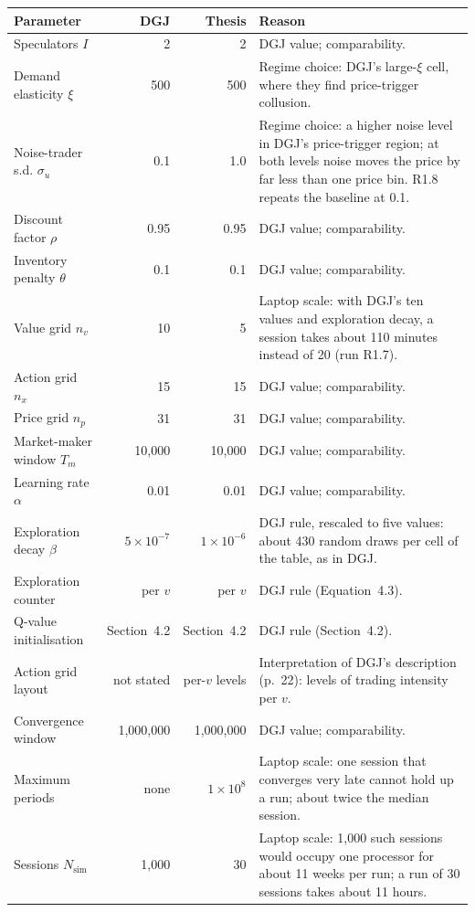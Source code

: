 \begin{tabular}{lrr>{\raggedright\arraybackslash}p{5.6cm}}
\toprule
Parameter & DGJ & Thesis & Reason \\
\midrule
Speculators $I$ & 2 & 2 & DGJ value; comparability. \\
Demand elasticity $\xi$ & 500 & 500 & Regime choice: DGJ's large-$\xi$ cell, where they find price-trigger collusion. \\
Noise-trader s.d. $\sigma_u$ & 0.1 & 1.0 & Regime choice: a higher noise level in DGJ's price-trigger region; at both levels noise moves the price by far less than one price bin. R1.8 repeats the baseline at 0.1. \\
Discount factor $\rho$ & 0.95 & 0.95 & DGJ value; comparability. \\
Inventory penalty $\theta$ & 0.1 & 0.1 & DGJ value; comparability. \\
Value grid $n_v$ & 10 & 5 & Laptop scale: with DGJ's ten values and exploration decay, a session takes about 110 minutes instead of 20 (run R1.7). \\
Action grid $n_x$ & 15 & 15 & DGJ value; comparability. \\
Price grid $n_p$ & 31 & 31 & DGJ value; comparability. \\
Market-maker window $T_m$ & 10,000 & 10,000 & DGJ value; comparability. \\
Learning rate $\alpha$ & 0.01 & 0.01 & DGJ value; comparability. \\
Exploration decay $\beta$ & $5\times10^{-7}$ & $1\times10^{-6}$ & DGJ rule, rescaled to five values: about 430 random draws per cell of the table, as in DGJ. \\
Exploration counter & per $v$ & per $v$ & DGJ rule (Equation~4.3). \\
Q-value initialisation & Section~4.2 & Section~4.2 & DGJ rule (Section~4.2). \\
Action grid layout & not stated & per-$v$ levels & Interpretation of DGJ's description (p.~22): levels of trading intensity per $v$. \\
Convergence window & 1,000,000 & 1,000,000 & DGJ value; comparability. \\
Maximum periods & none & $1\times10^{8}$ & Laptop scale: one session that converges very late cannot hold up a run; about twice the median session. \\
Sessions $N_{\mathrm{sim}}$ & 1,000 & 30 & Laptop scale: 1,000 such sessions would occupy one processor for about 11 weeks per run; a run of 30 sessions takes about 11 hours. \\

\end{tabular}
